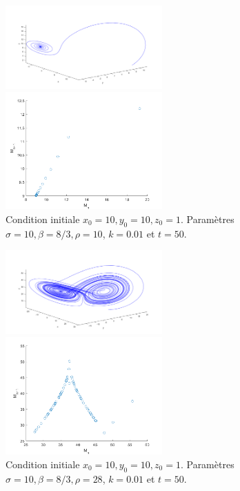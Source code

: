 \documentclass[a4paper, 12pt]{report}
\begin{document}
\begin{figure}[H]
    \centering
    \begin{minipage}[t]{6cm}
        \centering
        \includegraphics[width=6cm]{images/lorenz10.png}
    \end{minipage}\hspace{1cm}
    \begin{minipage}[t]{6cm}
        \centering
        \includegraphics[width=6cm]{images/lorenz_m_10.png}
    \end{minipage}
    \caption{Condition initiale $x_0 = 10, y_0 = 10, z_0=1$. Paramètres $\sigma=10, \beta=8/3, \rho=10$, $k=0.01$ et $t=50$.}
\end{figure}

\begin{figure}[H]
    \centering
    \begin{minipage}[t]{6cm}
        \centering
        \includegraphics[width=6cm]{images/lorenz28.png}
    \end{minipage}\hspace{1cm}
    \begin{minipage}[t]{6cm}
        \centering
        \includegraphics[width=6cm]{images/lorenz_m_28.png}
    \end{minipage}
    \caption{Condition initiale $x_0 = 10, y_0 = 10, z_0=1$. Paramètres $\sigma=10, \beta=8/3, \rho=28$, $k=0.01$ et $t=50$.}
\end{figure}
\end{document}
